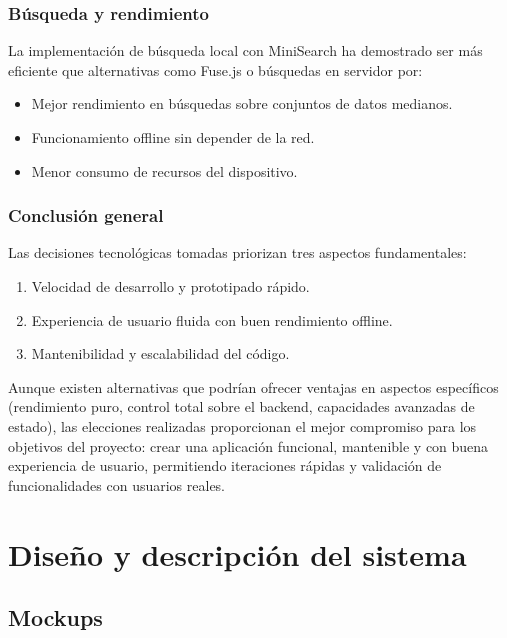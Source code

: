 \documentclass[twoside, openright, 11pt]{report}
\begin{document}
	\subsection*{Búsqueda y rendimiento}
	La implementación de búsqueda local con MiniSearch ha demostrado ser más eficiente que alternativas como Fuse.js o búsquedas en servidor por:
	\begin{itemize}
		\item Mejor rendimiento en búsquedas sobre conjuntos de datos medianos.
		\item Funcionamiento offline sin depender de la red.
		\item Menor consumo de recursos del dispositivo.
	\end{itemize}
	
	\subsection*{Conclusión general}
	Las decisiones tecnológicas tomadas priorizan tres aspectos fundamentales:
	\begin{enumerate}
		\item Velocidad de desarrollo y prototipado rápido.
		\item Experiencia de usuario fluida con buen rendimiento offline.
		\item Mantenibilidad y escalabilidad del código.
	\end{enumerate}
	
	Aunque existen alternativas que podrían ofrecer ventajas en aspectos específicos (rendimiento puro, control total sobre el backend, capacidades avanzadas de estado), las elecciones realizadas proporcionan el mejor compromiso para los objetivos del proyecto: crear una aplicación funcional, mantenible y con buena experiencia de usuario, permitiendo iteraciones rápidas y validación de funcionalidades con usuarios reales.

\chapter{Diseño y descripción del sistema}\label{cap.diseno y descripcion del sistema} %
  \section{Mockups}
  
\end{document}
